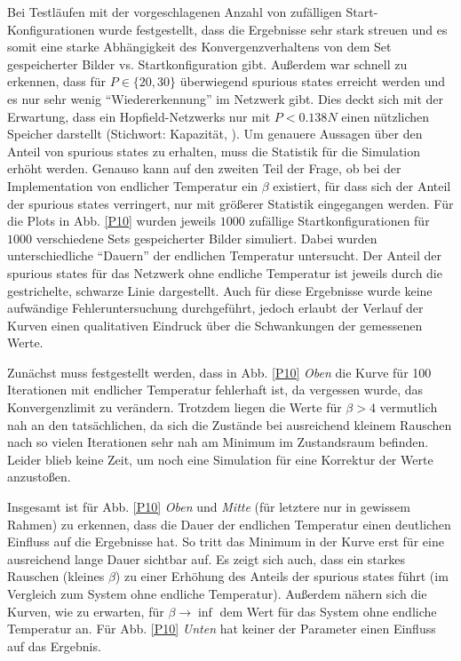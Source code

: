 \documentclass[12pt,a4paper]{article}
\begin{document}
Bei Testläufen mit der vorgeschlagenen Anzahl von zufälligen Start-Konfigurationen wurde festgestellt, dass die Ergebnisse sehr stark streuen und es somit eine starke Abhängigkeit des Konvergenzverhaltens von dem Set gespeicherter Bilder vs. Startkonfiguration gibt.
Außerdem war schnell zu erkennen, dass für $P \in \{20, 30\}$ überwiegend spurious states erreicht werden und es nur sehr wenig "`Wiedererkennung"' im Netzwerk gibt. Dies deckt sich mit der Erwartung, dass ein Hopfield-Netzwerks nur mit $P < 0.138 N$ einen nützlichen Speicher darstellt (Stichwort: Kapazität, \cite{buch}). Um genauere Aussagen über den Anteil von spurious states zu erhalten, muss die Statistik für die Simulation erhöht werden. Genauso kann auf den zweiten Teil der Frage, ob bei der Implementation von endlicher Temperatur ein $\beta$ existiert, für dass sich der Anteil der spurious states verringert, nur mit größerer Statistik eingegangen werden. Für die Plots in Abb. \ref{P10} wurden jeweils $1000$ zufällige Startkonfigurationen für $1000$ verschiedene Sets gespeicherter Bilder simuliert. Dabei wurden unterschiedliche "`Dauern"' der endlichen Temperatur untersucht. Der Anteil der spurious states für das Netzwerk ohne endliche Temperatur ist jeweils durch die gestrichelte, schwarze Linie dargestellt. Auch für diese Ergebnisse wurde keine aufwändige Fehleruntersuchung durchgeführt, jedoch erlaubt der Verlauf der Kurven einen qualitativen Eindruck über die Schwankungen der gemessenen Werte.

Zunächst muss festgestellt werden, dass in Abb. \ref{P10} \textit{Oben} die Kurve für 100 Iterationen mit endlicher Temperatur fehlerhaft ist, da vergessen wurde, das Konvergenzlimit zu verändern. Trotzdem liegen die Werte für $\beta > 4$ vermutlich nah an den tatsächlichen, da sich die Zustände bei ausreichend kleinem Rauschen nach so vielen Iterationen sehr nah am Minimum im Zustandsraum befinden. Leider blieb keine Zeit, um noch eine Simulation für eine Korrektur der Werte anzustoßen.

Insgesamt ist für Abb. \ref{P10} \textit{Oben} und \textit{Mitte} (für letztere nur in gewissem Rahmen) zu erkennen, dass die Dauer der endlichen Temperatur einen deutlichen Einfluss auf die Ergebnisse hat. So tritt das Minimum in der Kurve erst für eine ausreichend lange Dauer sichtbar auf. Es zeigt sich auch, dass ein starkes Rauschen (kleines $\beta$) zu einer Erhöhung des Anteils der spurious states führt (im Vergleich zum System ohne endliche Temperatur). Außerdem nähern sich die Kurven, wie zu erwarten, für $\beta \rightarrow \inf$ dem Wert für das System ohne endliche Temperatur an. Für Abb. \ref{P10} \textit{Unten} hat keiner der Parameter einen Einfluss auf das Ergebnis.
\end{document}
